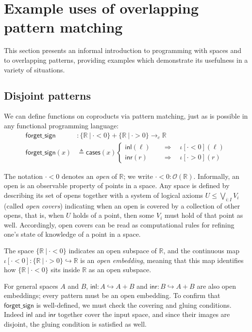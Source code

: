 \documentclass[conference]{IEEEtran}
\newcommand{\hookto}{\hookrightarrow}
\newcommand{\cto}{\to_c}
\newcommand{\R}{\mathbb{R}}
\newcommand{\suchthat}{\ |\ }
\newcommand{\Open}[1]{\mathcal{O}({#1})}
\newcommand{\oinclf}[1]{\iota[{#1}]}
\newcommand{\oincl}[2]{\oinclf{#1} \left({#2}\right)}
\newcommand{\Branch}{\Rightarrow}
\begin{document}
\section{Example uses of overlapping pattern matching}
\label{s:examples}

This section presents an informal introduction to programming with spaces and to overlapping patterns, providing examples which demonstrate its usefulness in a variety of situations.

\subsection{Disjoint patterns}

We can define functions on coproducts via pattern matching, just as is possible in any functional programming language:
\begin{align*}
\mathsf{forget\_sign} &: \{ \R \suchthat \cdot < 0 \} + \{ \R \suchthat \cdot > 0 \} \cto \R
\\ \mathsf{forget\_sign}(x) &\triangleq
  \mathsf{cases}(x)
  \begin{cases}
  \mathsf{inl}(\ell) \quad &\Branch \quad \oincl{\cdot < 0}{\ell}
  \\ \mathsf{inr}(r) \quad &\Branch \quad \oincl{\cdot > 0}{r}
  \end{cases}
\end{align*}

The notation $\cdot < 0$ denotes an \emph{open} of $\R$; we write $\cdot < 0 : \Open{\R}$. Informally, an open is an observable property of points in a space. Any space is defined by describing its set of opens together with a system of logical axioms $U \le \bigvee_{i : I} V_i$ (called \emph{open covers}) indicating when an open is covered by a collection of other opens, that is, when $U$ holds of a point, then some $V_i$ must hold of that point as well. Accordingly, open covers can be read as computational rules for refining one's state of knowledge of a point in a space.

The space $\{ \R \suchthat \cdot < 0 \}$ indicates an open subspace of $\R$, and the continuous map $\oinclf{\cdot < 0} : \{ \R \suchthat \cdot > 0 \} \hookto \R$ is an \emph{open embedding}, meaning that this map identifies how $\{ \R \suchthat \cdot < 0 \}$ sits inside $\R$ as an open subspace.

For general spaces $A$ and $B$, $\mathsf{inl} : A \hookto A + B$ and $\mathsf{inr} : B \hookto A + B$ are also open embeddings; every pattern must be an open embedding. To confirm that $\mathsf{forget\_sign}$ is well-defined, we must check the covering and gluing conditions. Indeed $\mathsf{inl}$ and $\mathsf{inr}$ together cover the input space, and since their images are disjoint, the gluing condition is satisfied as well.
\end{document}
